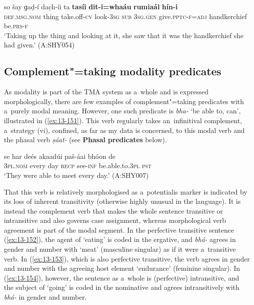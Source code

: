 \begin{exe}
\ex
\label{ex:13-150}
\gll so šay ɡaḍ-í dac̣h-íi ta \textbf{tasíi} \textbf{dit-i=whaáu} \textbf{rumiaál} \textbf{hín-i}\\
\textsc{def.msg.nom} thing take.off-\textsc{cv} look-\textsc{3sg} \textsc{sub} \textsc{3sg.gen} give.\textsc{pptc-f}=\textsc{adj} handkerchief be.\textsc{prs-f}\\
\glt `Taking up the thing and looking at it, she saw that it was the handkerchief she had given.' (A:SHY054)
\end{exe}

\subsection{Complement"=taking modality predicates}
\label{subsec:13-5-2}

 As modality is part of the TMA system as a~whole and is expressed morphologically, there are few examples of complement"=taking predicates with a~purely modal meaning. However, one such predicate is \textit{bha-} `be able to, can', illustrated in (\ref{ex:13-151}). This verb regularly takes an~infinitival complement, a~strategy (vi), confined, as far as my data is concerned, to this modal verb and the phasal verb \textit{ṣáat-} (see \textbf{Phasal predicates} below).

\begin{exe}
\ex
\label{ex:13-151}
\gll se har deés akaadúi paš-áai bhóon de\\
\textsc{3pl.nom} every day \textsc{recp} see-\textsc{inf} be.able.to.\textsc{3pl} \textsc{pst}\\
\glt `They were able to meet every day.' (A:SHY007) 
\end{exe}

That this verb is relatively morphologised as a~potentialis marker is indicated by its loss of inherent transitivity (otherwise highly unusual in the language). It is instead the complement verb that makes the whole sentence transitive or intransitive and also governs case assignment, whereas morphological verb agreement is part of the modal segment. In the perfective transitive sentence (\ref{ex:13-152}), the agent of `eating' is coded in the ergative, and \textit{bhá-} agrees in gender and number with `meat' (masculine singular) as if it were a~transitive verb. In (\ref{ex:13-153}), which is also perfective transitive, the verb agrees in gender and number with the agreeing host element `endurance' (feminine singular). In (\ref{ex:13-154}), however, the sentence as a~whole is (perfective) intransitive, and the subject of `going' is coded in the nominative and agrees intransitively with \textit{bhá-} in gender and number.

